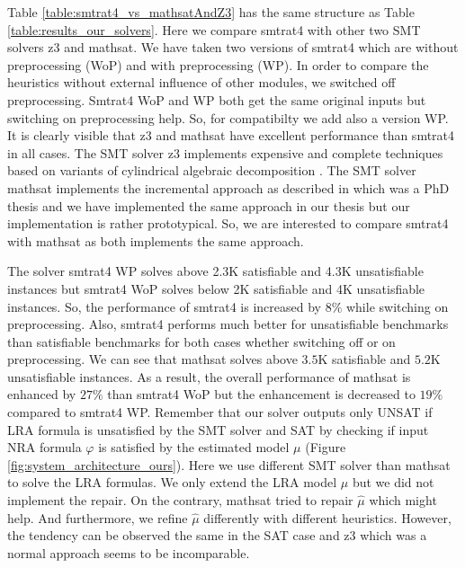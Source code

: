\noindent Table \ref{table:smtrat4_vs_mathsatAndZ3} has the same structure as Table \ref{table:results_our_solvers}.
Here we compare smtrat4 with other two SMT solvers z3 and mathsat.
We have taken two versions of smtrat4 which are without preprocessing (WoP) and with preprocessing (WP).
In order to compare the heuristics without external influence of other modules, we switched off preprocessing.
Smtrat4 WoP and WP both get the same original inputs but switching on preprocessing help.
So, for compatibilty we add also a version WP.
It is clearly visible that z3 and mathsat have excellent performance than smtrat4 in all cases.
The SMT solver z3 implements expensive and complete techniques based on variants of cylindrical algebraic decomposition \cite{Cimatti:2018:ILS:3274693.3230639}.
The SMT solver mathsat implements the incremental approach as described in \cite{Cimatti:2018:ILS:3274693.3230639} which was a PhD thesis and we have implemented the same approach in our thesis but our implementation is rather prototypical.
So, we are interested to compare smtrat4 with mathsat as both implements the same approach.\newline

\noindent The solver smtrat4 WP solves above 2.3K satisfiable and 4.3K unsatisfiable instances but smtrat4 WoP solves below 2K satisfiable and 4K unsatisfiable instances.
So, the performance of smtrat4 is increased by $8\%$ while switching on preprocessing.
Also, smtrat4 performs much better for unsatisfiable benchmarks than satisfiable benchmarks for both cases whether switching off or on preprocessing.
We can see that mathsat solves above $3.5$K satisfiable and $5.2$K unsatisfiable instances.
As a result, the overall performance of mathsat is enhanced by $27\%$ than smtrat4 WoP but the enhancement is decreased to $19\%$ compared to smtrat4 WP.
Remember that our solver outputs only UNSAT if LRA formula is unsatisfied by the SMT solver and SAT by checking if input NRA formula $\varphi$ is satisfied by the estimated model $\mu$ (Figure \ref{fig:system_architecture_ours}).
Here we use different SMT solver than mathsat to solve the LRA formulas.
We only extend the LRA model $\hat{\mu}$ but we did not implement the repair.
On the contrary, mathsat tried to repair $\hat{\mu}$ which might help.
And furthermore, we refine $\hat{\mu}$ differently with different heuristics.
However, the tendency can be observed the same in the SAT case and z3 which was a normal approach seems to be incomparable.\newline

